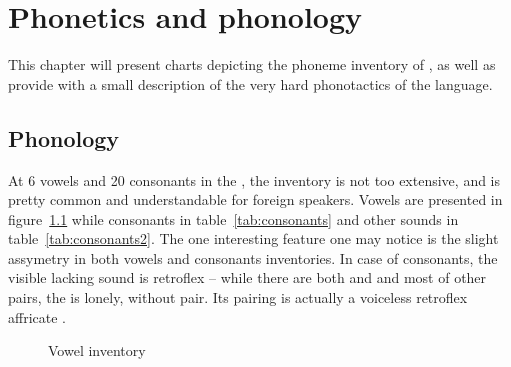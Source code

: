 \chapter{Phonetics and phonology}
\label{ch:phonetics}

This chapter will present charts depicting the phoneme inventory of \andro, as
well as provide with a small description of the very hard phonotactics of the
language.

\section{Phonology}

At 6 vowels and 20 consonants in the , the inventory is not
too extensive, and is pretty common and understandable for foreign speakers.
Vowels are presented in figure~\ref{fig:vowels} while consonants in
table~\ref{tab:consonants} and other sounds in table~\ref{tab:consonants2}. The
one interesting feature one may notice is the slight assymetry in both vowels
and consonants inventories. In case of consonants, the visible lacking sound is
retroflex  -- while there are both  and  and most of other
pairs, the  is lonely, without pair. Its pairing is actually a voiceless
retroflex affricate .

\begin{figure}
    \begin{center}
        {\Large
            \begin{vowel}
            \end{vowel}
        }
    \end{center}
    \label{fig:vowels}
    \caption{Vowel inventory}
\end{figure}

